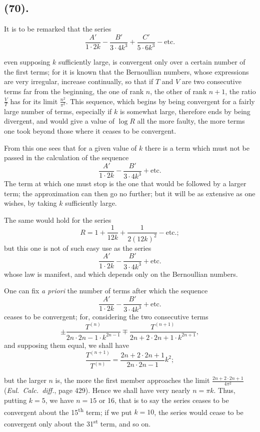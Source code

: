 \documentclass{article}
\begin{document}
\subsection*{(70).}

It is to be remarked that the series
\[ \frac{A'}{1\cdot2k}-\frac{B'}{3\cdot4k^{3}}+\frac{C'}{5\cdot6k^{3}}-\text{etc.} \]

even supposing $k$ sufficiently large, is convergent only over a certain number of the first terms; for it is known that the Bernoullian numbers, whose expressions are very irregular, increase continually, so that if $T$ and $V$ are two consecutive terms far from the beginning, the one of rank $n$, the other of rank $n+1$, the ratio $\frac{V}{T}$ has for its limit $\frac{n^{2}}{\pi^{2}}$. This sequence, which begins by being convergent for a fairly large number of terms, especially if $k$ is somewhat large, therefore ends by being divergent, and would give a value of $\log R$ all the more faulty, the more terms one took beyond those where it ceases to be convergent.

From this one sees that for a given value of $k$ there is a term which must not be passed in the calculation of the sequence
\[ \frac{A'}{1\cdot2k}-\frac{B'}{3\cdot4k^{3}}+\text{etc.} \]
The term at which one must stop is the one that would be followed by a larger term; the approximation can then go no further; but it will be as extensive as one wishes, by taking $k$ sufficiently large.

The same would hold for the series
\[ R=1+\frac{1}{12k}+\frac{1}{2(12k)^{2}}-\text{etc.}; \]
but this one is not of such easy use as the series
\[ \frac{A'}{1\cdot2k}-\frac{B'}{3\cdot4k^{3}}+\text{etc.} \]
whose law is manifest, and which depends only on the Bernoullian numbers.

One can fix \emph{a priori} the number of terms after which the sequence
\[ \frac{A'}{1\cdot2k}-\frac{B'}{3\cdot4k^{3}}+\text{etc.} \]
ceases to be convergent; for, considering the two consecutive terms
\[ \pm\frac{T^{(n)}}{2n\cdot2n-1\cdot k^{2n-1}}\mp\frac{T^{(n+1)}}{2n+2\cdot2n+1\cdot k^{2n+1}}, \]
and supposing them equal, we shall have
\[ \frac{T^{(n+1)}}{T^{(n)}}=\frac{2n+2\cdot2n+1}{2n\cdot2n-1}k^{2}; \]

but the larger $n$ is, the more the first member approaches the limit $\frac{2n+2\cdot2n+1}{4\pi^{2}}$ (\emph{Eul.\ Calc.\ diff.}, page 429). Hence we shall have very nearly $n=\pi k$. Thus, putting $k=5$, we have $n=15$ or 16, that is to say the series ceases to be convergent about the 15\textsuperscript{th} term; if we put $k=10$, the series would cease to be convergent only about the 31\textsuperscript{st} term, and so on.
\end{document}
